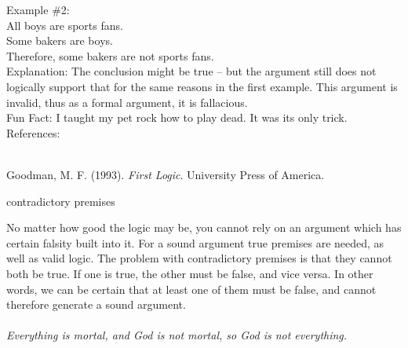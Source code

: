 \documentclass[a4paper,12pt,single,pdftex]{scrartcl}
\begin{document}
      
        Example \#2:
      \\

      
        All boys are sports fans.
      \\

      
        Some bakers are boys.
      \\

      
        Therefore, some bakers are not sports fans.
      \\

      
        Explanation: The conclusion might be true -- but the argument still does not logically support that for the same reasons in the first example.  This argument is invalid, thus as a formal argument, it is fallacious.
      \\

      
        Fun Fact: I taught my pet rock how to play dead. It was its only trick.
      \\

    
    References:

    
      
        
      \\

      
        
          Goodman, M. F. (1993). {\it First Logic}. University Press of America.
        
      
    
  

contradictory premises
    
      
      
      
      
      
      
      
    
    
      
        No matter how good the logic may be, you cannot rely on an argument which has certain falsity built into it. For a sound argument true premises are needed, as well as valid logic. The problem with contradictory premises is that they cannot both be true. If one is true, the other must be false, and vice versa. In other words, we can be certain that at least one of them must be false, and cannot therefore generate a sound argument.
      \\

      
         
      \\

      
        {\em Everything is mortal, and God is not mortal, so God is not everything.}
      \\
\end{document}
